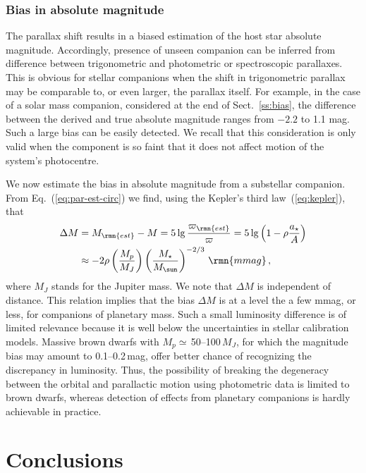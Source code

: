 \documentclass[fleqn,usenatbib,useAMS,usedcolumn]{mnras}
\begin{document}
\subsubsection{Bias in absolute magnitude}

The parallax shift results in a biased estimation of the host star absolute magnitude. Accordingly, presence of unseen companion can be inferred from difference between trigonometric and photometric or spectroscopic parallaxes. This is obvious for stellar companions when the shift in trigonometric parallax may be comparable to, or even larger, the parallax itself. For example, in the case of a solar mass companion, considered at the end of Sect.~\ref{ss:bias}, the difference between the derived and true absolute magnitude ranges from $-2.2$ to 1.1 mag. Such a large bias can be easily detected.
We recall that this consideration is only valid when the component is so faint that it does not affect motion of the system's photocentre.

We now estimate the bias in absolute magnitude from a substellar companion.  From Eq.~(\ref{eq:par-est-circ}) we find, using the Kepler's third law~(\ref{eq:kepler}), that
\begin{equation}
 \begin{aligned}
 \Delta M&=
 M_\rmn{est}-M=5\lg\frac{\varpi_\rmn{est}}{\varpi}=5\lg\left(1-\rho\frac{a_\star}{A}\right)\\
 &\approx -2\rho\left(\frac{M_p}{M_J}\right)\left(\frac{M_\star}{M_{\sun}}\right)^{-2/3}\,\rmn{mmag}\,,
 \end{aligned}
\end{equation}
where $M_J$ stands for the Jupiter mass. We note that $\Delta M$ is independent of distance. This relation implies that the bias $\Delta M$ is at a level the a few mmag, or less, for companions of planetary mass. Such a small luminosity difference is of limited relevance because it is well below the uncertainties in stellar calibration models. Massive brown dwarfs with $M_p\simeq$\,50--100\,$M_J$, for which the magnitude bias may amount to 0.1--0.2\,mag, offer better chance of recognizing the discrepancy in luminosity. Thus, the possibility of breaking the degeneracy between the orbital and parallactic motion using photometric data is limited to brown dwarfs, whereas detection of effects from planetary companions is hardly achievable in practice.

\section{Conclusions}
\label{s:conclusions}
\end{document}
